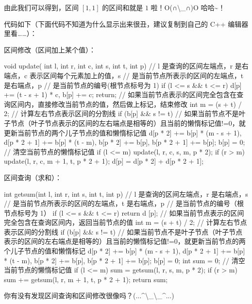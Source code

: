由此我们可以得到，区间 $[1,1]$ 的区间和就是 $1$ 啦！O(∩\textbackslash{}\_∩)O 哈哈\textasciitilde{}！

代码如下（下面代码不知道为什么显示出来很丑，建议复制到自己的 C++ 编辑器里看……）：

区间修改（区间加上某个值）：

\begin{cppcode}
void update(
    int l, int r, int c, int s, int t,
    int p)  // l 是查询的区间左端点，r 是右端点，c 表示区间每个元素加上的值，s
            // 是当前节点所表示的区间的左端点，t 是右端点，p
            // 是当前节点的编号(根节点标号为 1)
{
  if (l <= s && t <= r) {
    d[p] += (t - s + 1) * c, b[p] += c;
    return;
  }  // 如果当前节点表示的区间完全包含在查询区间内，直接修改当前节点的值，然后做上标记，结束修改
  int m = (s + t) / 2;  // 计算左右节点表示区间的分割线
  if (b[p] &&
      s !=
          t)  // 如果当前节点不是叶子节点（叶子节点表示的区间的左右端点是相等的）且当前的懒惰标记值!=0，就更新当前节点的两个儿子节点的值和懒惰标记值
    d[p * 2] += b[p] * (m - s + 1), d[p * 2 + 1] += b[p] * (t - m),
        b[p * 2] += b[p], b[p * 2 + 1] += b[p];
  b[p] = 0;  // 清空当前节点的懒惰标记值
  if (l <= m) update(l, r, c, s, m, p * 2);
  if (r > m) update(l, r, c, m + 1, t, p * 2 + 1);
  d[p] = d[p * 2] + d[p * 2 + 1];
}
\end{cppcode}

区间查询（求和）：

\begin{cppcode}
int getsum(int l, int r, int s, int t,
           int p)  // l 是查询的区间左端点，r 是右端点，s
                   // 是当前节点所表示的区间的左端点，t 是右端点，p
                   // 是当前节点的编号（根节点标号为 1）
{
  if (l <= s && t <= r)
    return d
        [p];  // 如果当前节点表示的区间完全包含在查询区间内，返回当前节点的值
  int m = (s + t) / 2;  // 计算左右节点表示区间的分割线
  if (b[p] &&
      s !=
          t)  // 如果当前节点不是叶子节点（叶子节点表示的区间的左右端点是相等的）且当前的懒惰标记值!=0，就更新当前节点的两个儿子节点的值和懒惰标记
    d[p * 2] += b[p] * (m - s + 1), d[p * 2 + 1] += b[p] * (t - m),
        b[p * 2] += b[p], b[p * 2 + 1] += b[p];
  b[p] = 0;
  int sum = 0;  // 清空当前节点的懒惰标记值
  if (l <= m) sum = getsum(l, r, s, m, p * 2);
  if (r > m) sum += getsum(l, r, m + 1, t, p * 2 + 1);
  return sum;
}
\end{cppcode}

你有没有发现区间查询和区间修改很像吗？(...\textasciicircum{}\textbackslash{}\_\textbackslash{}\_\textasciicircum{}...)


